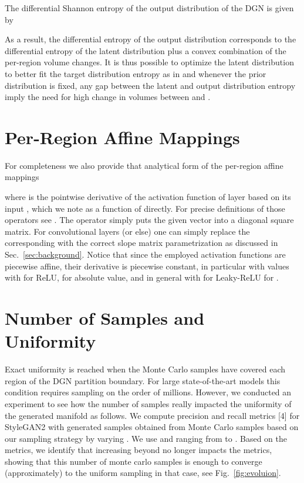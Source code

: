 \begin{cor}
\label{cor:entropy}
The differential Shannon entropy of the output distribution  of the DGN is given by

\end{cor}




As a result, the differential entropy of the output distribution  corresponds to the differential entropy of the latent distribution  plus a convex combination of the per-region volume changes. It is thus possible to optimize the latent distribution  to better fit the target distribution entropy as in \cite{ben2018gaussian} and whenever the prior distribution is fixed, any gap between the latent and output distribution entropy imply the need for high change in volumes between  and .


\section{Per-Region Affine Mappings}
\label{appendix:affine}

For completeness we also provide that analytical form of the per-region affine mappings

where  is the pointwise derivative of the activation function of layer  based on its input , which we note as a function of  directly. For precise definitions of those operators see \cite{balestriero2020mad}.
The  operator simply puts the given vector into a diagonal square matrix. For convolutional layers (or else) one can simply replace the corresponding  with the correct slope matrix parametrization as discussed in Sec.~\ref{sec:background}. Notice that since the employed activation functions  are piecewise affine, their derivative is piecewise constant, in particular with values  with  for ReLU,  for absolute value, and in general with  for Leaky-ReLU for . 


\section{Number of Samples and Uniformity}
\label{sec:NvsK}

Exact uniformity is reached when the Monte Carlo samples have covered each region of the DGN partition boundary. For large state-of-the-art models this condition requires sampling on the order of millions. However, we conducted an experiment to see how the number of samples really impacted the uniformity of the generated manifold as follows. We compute precision and recall metrics [4] for StyleGAN2 with  generated samples obtained from  Monte Carlo samples based on our sampling strategy by varying . We use  and  ranging from  to . Based on the metrics, we identify that increasing beyond  no longer impacts the metrics, showing that this number of monte carlo samples is enough to converge (approximately) to the uniform sampling in that case, see Fig.~\ref{fig:evoluion}.

